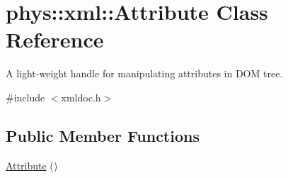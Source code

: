 \hypertarget{classphys_1_1xml_1_1Attribute}{
\section{phys::xml::Attribute Class Reference}
\label{da/ddf/classphys_1_1xml_1_1Attribute}
}


A light-\/weight handle for manipulating attributes in DOM tree.  




{\ttfamily \#include $<$xmldoc.h$>$}

\subsection*{Public Member Functions}
\begin{DoxyCompactItemize}
\item 
\hypertarget{classphys_1_1xml_1_1Attribute_a962ad273e447bb714925c331e00cc3e7}{
\hyperlink{classphys_1_1xml_1_1Attribute_a962ad273e447bb714925c331e00cc3e7}{Attribute} ()}
\label{da/ddf/classphys_1_1xml_1_1Attribute_a962ad273e447bb714925c331e00cc3e7}


\end{DoxyCompactItemize}
